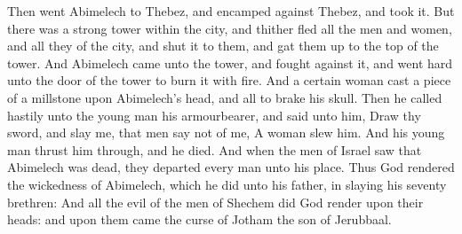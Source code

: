 \begin{biblechapter}
\verse Then went Abimelech to Thebez, and encamped against Thebez, and took it.
\verse But there was a strong tower within the city, and thither fled all the men and women, and all they of the city, and shut it to them, and gat them up to the top of the tower.
\verse And Abimelech came unto the tower, and fought against it, and went hard unto the door of the tower to burn it with fire.
\verse And a certain woman cast a piece of a millstone upon Abimelech's head, and all to brake his skull.
\verse Then he called hastily unto the young man his armourbearer, and said unto him, Draw thy sword, and slay me, that men say not of me, A woman slew him. And his young man thrust him through, and he died.
\verse And when the men of Israel saw that Abimelech was dead, they departed every man unto his place.
\verse Thus God rendered the wickedness of Abimelech, which he did unto his father, in slaying his seventy brethren:
\verse And all the evil of the men of Shechem did God render upon their heads: and upon them came the curse of Jotham the son of Jerubbaal.
\end{biblechapter}

